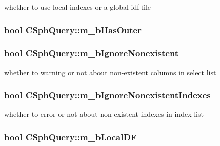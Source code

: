 whether to use local indexes or a global idf file 

\hypertarget{classCSphQuery_ab18a4f8710e145740e274d94a77a8764}{
\subsubsection[{m\-\_\-b\-Has\-Outer}]{\setlength{\rightskip}{0pt plus 5cm}bool C\-Sph\-Query\-::m\-\_\-b\-Has\-Outer}}\label{classCSphQuery_ab18a4f8710e145740e274d94a77a8764}
\hypertarget{classCSphQuery_ae41f8c8748a013d131f2c24ce7424adb}{
\subsubsection[{m\-\_\-b\-Ignore\-Nonexistent}]{\setlength{\rightskip}{0pt plus 5cm}bool C\-Sph\-Query\-::m\-\_\-b\-Ignore\-Nonexistent}}\label{classCSphQuery_ae41f8c8748a013d131f2c24ce7424adb}


whether to warning or not about non-\/existent columns in select list 

\hypertarget{classCSphQuery_afd12259370b1d3c693fcba4de46eb2f3}{
\subsubsection[{m\-\_\-b\-Ignore\-Nonexistent\-Indexes}]{\setlength{\rightskip}{0pt plus 5cm}bool C\-Sph\-Query\-::m\-\_\-b\-Ignore\-Nonexistent\-Indexes}}\label{classCSphQuery_afd12259370b1d3c693fcba4de46eb2f3}


whether to error or not about non-\/existent indexes in index list 

\hypertarget{classCSphQuery_acb2dafa5753a50ada9e5bb51670e658b}{
\subsubsection[{m\-\_\-b\-Local\-D\-F}]{\setlength{\rightskip}{0pt plus 5cm}bool C\-Sph\-Query\-::m\-\_\-b\-Local\-D\-F}}\label{classCSphQuery_acb2dafa5753a50ada9e5bb51670e658b}


